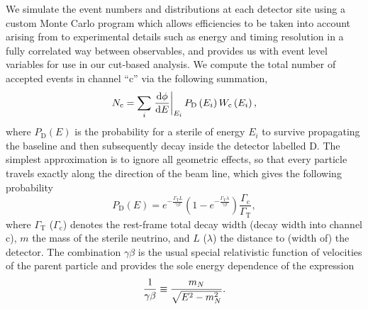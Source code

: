 \documentclass[11pt, a4paper]{article}
\def\ster{\ensuremath N}
\begin{document}
We simulate the event numbers and distributions at each detector site using a custom
Monte Carlo program which allows efficiencies to be taken into account arising from to
experimental details such as energy and timing resolution in a fully correlated
way between observables, and provides us with event level variables for use in
our cut-based analysis. We compute the total number of accepted events in
channel ``$\text{c}$'' via the following summation,
%
\[ \ster_\text{c} = \sum_{i} \left .
\frac{\mathrm{d}\phi}{\mathrm{d}E}\right|_{E_i} P_\text{D}\left(E_i\right)
W_\text{c}\left(E_i\right),  \]
%
where $P_\text{D}(E)$ is the probability for a sterile of energy $E_i$ to survive propagating the baseline
and then subsequently decay inside the detector labelled $\text{D}$. The simplest
approximation is to ignore all geometric effects, so that every particle
travels exactly along the direction of the beam line, which gives the following
probability 
%
\[ P_\text{D}\left(E\right) = e^{-\frac{\Gamma_\text{T}L}{\gamma\beta}}\left(
1-
e^{-\frac{\Gamma_\text{T}\lambda}{\gamma\beta}}\right)\frac{\Gamma_\text{c}}{\Gamma_\text{T}},
\label{eq:prob} \]
%
where $\Gamma_\text{T}$ ($\Gamma_\text{c}$) denotes the rest-frame total decay
width (decay width into channel $\text{c}$), $m$ the mass of the sterile
neutrino, and $L$ ($\lambda$) the distance to (width of) the detector. The
combination $\gamma\beta$ is the usual special relativistic function of
velocities of the parent particle and provides the sole energy dependence of
the expression
%
\[   \frac{1}{\gamma\beta} \equiv \frac{m_\ster}{\sqrt{E^2-m_\ster^2}}. \]
%
\end{document}
